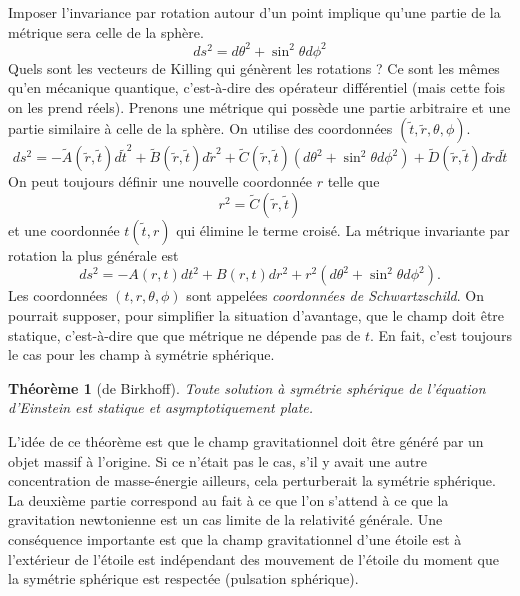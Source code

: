 \documentclass[a4paper,11pt]{report}
\theoremstyle{definition}
\theoremstyle{plain}
\newtheorem{thm}{Théorème}[chapter]
\theoremstyle{definition}
\theoremstyle{remark}
\begin{document}
        Imposer l'invariance par rotation autour d'un point implique qu'une partie de la métrique sera celle de la sphère.
        \begin{equation}
            ds^2 = d\theta^2+\sin^2\theta d\phi^2
        \end{equation}
        Quels sont les vecteurs de Killing qui génèrent les rotations ? Ce sont les mêmes qu'en mécanique quantique, c'est-à-dire des opérateur différentiel (mais cette fois on les prend réels). Prenons une métrique qui possède une partie arbitraire et une partie similaire à celle de la sphère. On utilise des coordonnées $(\tilde{t},\tilde{r},\theta,\phi)$.
        \begin{equation}
            ds^2 = -\tilde{A}(\tilde{r},\tilde{t}) d\tilde{t}^2+\tilde{B}(\tilde{r},\tilde{t}) d\tilde{r}^2 + \tilde{C}(\tilde{r},\tilde{t}) (d\theta^2+\sin^2\theta d\phi^2)+\tilde{D}(\tilde{r},\tilde{t}) d\tilde{r}d\tilde{t}
        \end{equation}
        On peut toujours définir une nouvelle coordonnée $r$ telle que
        \begin{equation}
            r^2 = \tilde{C}(\tilde{r},\tilde{t})
        \end{equation}
        et une coordonnée $t(\tilde{t},r)$ qui élimine le terme croisé. La métrique invariante par rotation la plus générale est
        \begin{equation}
            ds^2 = -A(r,t)dt^2+B(r,t)dr^2+r^2(d\theta^2+\sin^2\theta d\phi^2).
        \end{equation}
        Les coordonnées $(t,r,\theta,\phi)$ sont appelées \textit{coordonnées de Schwartzschild}. On pourrait supposer, pour simplifier la situation d'avantage, que le champ doit être statique, c'est-à-dire que que métrique ne dépende pas de $t$. En fait, c'est toujours le cas pour les champ à symétrie sphérique.
        
        \begin{thm}[de Birkhoff]
            Toute solution à symétrie sphérique de l'équation d'Einstein est statique et asymptotiquement plate.
        \end{thm}
        
        L'idée de ce théorème est que le champ gravitationnel doit être généré par un objet massif à l'origine. Si ce n'était pas le cas, s'il y avait une autre concentration de masse-énergie ailleurs, cela perturberait la symétrie sphérique. La deuxième partie correspond au fait à ce que l'on s'attend à ce que la gravitation newtonienne est un cas limite de la relativité générale. Une conséquence importante est que la champ gravitationnel d'une étoile est à l'extérieur de l'étoile est indépendant des mouvement de l'étoile du moment que la symétrie sphérique est respectée (pulsation sphérique).\\
        
\end{document}
